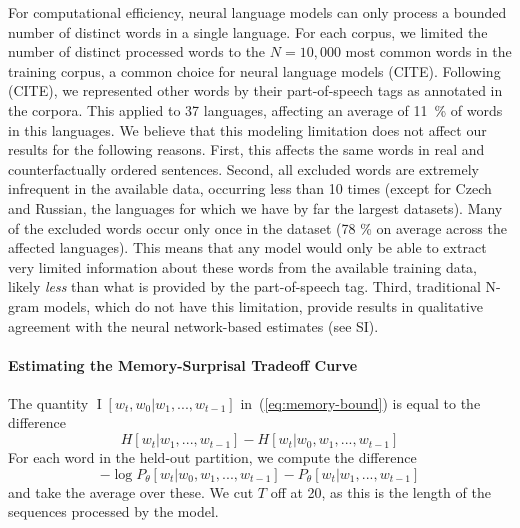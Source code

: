 \documentclass[11pt,letterpaper]{article}
\begin{document}
For computational efficiency, neural language models can only process a bounded number of distinct words in a single language.
For each corpus, we limited the number of distinct processed words to the $N=10,000$ most common words in the training corpus, a common choice for neural language models (CITE).
Following (CITE), we represented other words by their part-of-speech tags as annotated in the corpora.
This applied to 37 languages, affecting an average of 11~\% of words in this languages.
We believe that this modeling limitation does not affect our results for the following reasons.
First, this affects the same words in real and counterfactually ordered sentences.
Second, all excluded words are extremely infrequent in the available data, occurring less than 10 times (except for Czech and Russian, the languages for which we have by far the largest datasets).
Many of the excluded words occur only once in the dataset (78 \% on average across the affected languages).
This means that any model would only be able to extract very limited information about these words from the available training data, likely \emph{less} than what is provided by the part-of-speech tag.
Third, traditional N-gram models, which do not have this limitation, provide results in qualitative agreement with the neural network-based estimates (see SI).




\paragraph{Estimating the Memory-Surprisal Tradeoff Curve}



The quantity $\operatorname{I}[w_t, w_0 | w_1, ..., w_{t-1}]$ in~(\ref{eq:memory-bound}) is equal to the difference 
\begin{equation}
H[w_t|w_1, ..., w_{t-1}] - H[w_t|w_0, w_1, ..., w_{t-1}]
\end{equation}
For each word in the held-out partition, we compute the difference
\begin{equation}
	-\log P_\theta[w_t | w_0, w_1, ..., w_{t-1}] - P_\theta[w_t | w_1, ..., w_{t-1}]
\end{equation}
and take the average over these.
We cut $T$ off at 20, as this is the length of the sequences processed by the model.
\end{document}
